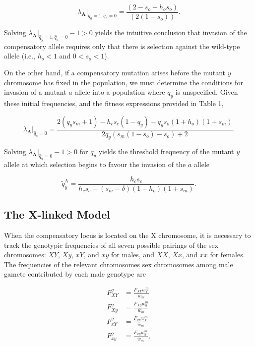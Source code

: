 \documentclass{article}
\begin{document}
\begin{equation} \label{eq:Lambda-a-qy1}
	\lambda_{\mathbf{A}}|_{\hat{q}_y = 1,\hat{q}_a = 0} = \frac{(2 - s_o - h_o s_o)} {(2 (1 - s_o))}.
\end{equation}

\noindent Solving $\lambda_{\mathbf{A}}|_{\hat{q}_y = 1,\hat{q}_a = 0} - 1 > 0$ yields the intuitive conclusion that invasion of the compensatory allele requires only that there is selection against the wild-type allele (i.e.,  $h_o < 1$ and $0 < s_o < 1$).

On the other hand, if a compensatory mutation arises before the mutant $y$ chromosome has fixed in the population, we must determine the conditions for invasion of a mutant $a$ allele into a population where $q_y$ is unspecified. Given these initial frequencies, and the fitness expressions provided in Table 1,

\begin{equation} \label{eq:Lambda-a}
	\lambda_{\mathbf{A}}|_{\hat{q}_a = 0} = \frac{2(q_y s_m + 1) - h_c s_c(1 - q_y) - q_y s_o (1 + h_o)(1 + s_m)} {2 q_y (s_m (1 - s_o) - s_o) + 2}.
\end{equation}

\noindent Solving $\lambda_{\mathbf{A}}|_{\hat{q}_a = 0} - 1 > 0$ for $q_y$ yields the threshold frequency of the mutant $y$ allele at which selection begins to favour the invasion of the $a$ allele

\begin{equation} \label{eq:aInvDelta-threshold}
	\tilde{q}_y^{\text{A}} = \frac{h_c s_c} {h_c s_c + (s_m - \delta)(1 - h_o)(1+s_m)}.
\end{equation}




\subsection{The X-linked Model}

When the compensatory locus is located on the X chromosome, it is necessary to track the genotypic frequencies of all seven possible pairings of the sex chromosomes: $XY$, $Xy$, $xY$, and $xy$ for males, and $XX$, $Xx$, and $xx$ for females. The frequencies of the relevant chromosomes sex chromosomes among male gamete contributed by each male genotype are

\begin{subequations}\begin{align} \label{eq:Fg-Xlinked}
	F_{XY}^{g} &= \frac{F_{XY}w^{m}_{Y}}{\overline{w}_{m}} \\
	F_{Xy}^{g} &= \frac{F_{Xy}w^{m}_{y}}{\overline{w}_{m}} \\
	F_{xY}^{g} &= \frac{F_{xY}w^{m}_{Y}}{\overline{w}_{m}} \\
	F_{xy}^{g} &= \frac{F_{xy}w^{m}_{y}}{\overline{w}_{m}}, 
\end{align}\end{subequations}
\end{document}
